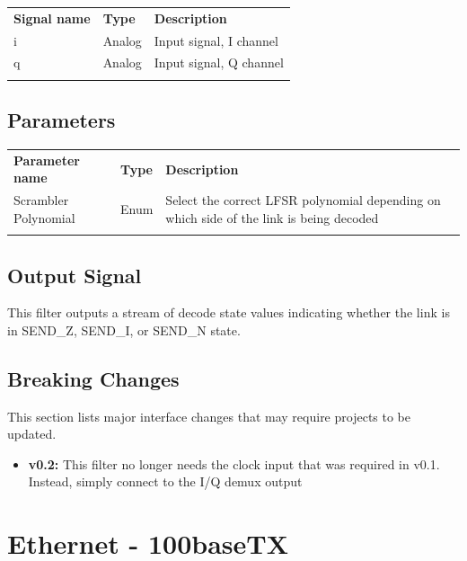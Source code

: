 \begin{tabularx}{16cm}{llX}
\thickhline
\textbf{Signal name} & \textbf{Type} & \textbf{Description} \\
\thickhline
i & Analog & Input signal, I channel\\
\thinhline
q & Analog & Input signal, Q channel\\
\thickhline
\end{tabularx}

\subsection{Parameters}

\begin{tabularx}{16cm}{llX}
\thickhline
\textbf{Parameter name} & \textbf{Type} & \textbf{Description} \\
\thickhline
Scrambler Polynomial & Enum & Select the correct LFSR polynomial depending on which side of the link is being decoded\\
\thickhline
\end{tabularx}

\subsection{Output Signal}

This filter outputs a stream of decode state values indicating whether the link is in SEND\_Z, SEND\_I, or SEND\_N
state.

\subsection{Breaking Changes}

This section lists major interface changes that may require projects to be updated.

\begin{itemize}
\item \textbf{v0.2:} This filter no longer needs the clock input that was required in v0.1.
Instead, simply connect to the I/Q demux output
\end{itemize}

\pagebreak
\section{Ethernet - 100baseTX}

